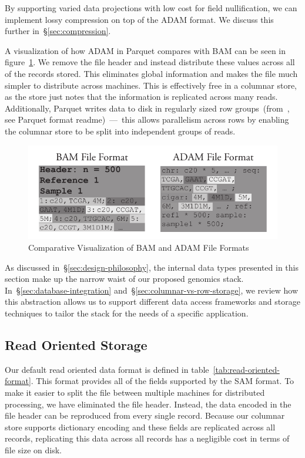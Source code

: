 \documentclass[10pt,twocolumn]{article}
\theoremstyle{plain}
\begin{document}
By supporting varied data projections with low cost for field nullification, we can implement lossy compression on top
of the ADAM format. We discuss this further in~\S\ref{sec:compression}.

A visualization of how ADAM in Parquet compares with BAM can be seen in figure~\ref{fig:file-format}. We remove the file header
and instead distribute these values across all of the records stored. This eliminates global information and makes the file much
simpler to distribute across machines. This is effectively free in a columnar store, as the store just notes that the information is
replicated across many reads. Additionally, Parquet writes data to disk in regularly sized row groups~(from~\cite{parquet}, see
Parquet format readme)~---~this allows parallelism across rows by enabling the columnar store to be split into independent
groups of reads.

\begin{figure}[h]
\begin{center}
\includegraphics[width=\linewidth]{file-format.pdf}
\end{center}
\caption{Comparative Visualization of BAM and ADAM File Formats}
\label{fig:file-format}
\end{figure}

As discussed in~\S\ref{sec:design-philosophy}, the internal data types presented in this section make up the narrow waist of our
proposed genomics stack. In~\S\ref{sec:database-integration} and~\S\ref{sec:columnar-vs-row-storage}, we review how this
abstraction allows us to support different data access frameworks and storage techniques to tailor the stack for the needs of
a specific application.

\subsection{Read Oriented Storage}
\label{sec:read-oriented-storage}

Our default read oriented data format is defined in table~\ref{tab:read-oriented-format}. This format provides all of the
fields supported by the SAM format. To make it easier to split the file between multiple machines for distributed processing,
we have eliminated the file header. Instead, the data encoded in the file header can be reproduced from every single
record. Because our columnar store supports dictionary encoding and these fields are replicated across all records,
replicating this data across all records has a negligible cost in terms of file size on disk.
\end{document}
